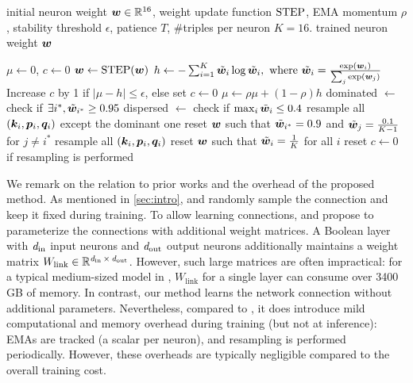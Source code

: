 \begin{algorithm}[tb]
  \caption{Adaptive Resampling}
  \label{alg:resampling}
  \begin{algorithmic}
     initial neuron weight ${\bm{w}} \in {\mathbb{R}}^{16}$, weight update function $\operatorname{STEP}$, EMA momentum $\rho$, stability threshold $\epsilon$, patience $T$, \#triples per neuron $K=16$.
     trained neuron weight ${\bm{w}}$

    \STATE $\mu \gets 0$, $c \gets 0$
    \REPEAT
      \STATE ${\bm{w}} \leftarrow \operatorname{STEP}({\bm{w}})$
      \STATE $h \gets - \sum_{i=1}^{K} \tilde{{\bm{w}}}_i \log \tilde{{\bm{w}}}_i, \text{ where } \tilde{{\bm{w}}}_i = \frac{\exp({\bm{w}}_i)}{\sum_j \exp({\bm{w}}_j)}$
      \STATE Increase $c$ by 1 if $|\mu - h| \le \epsilon$, else set $c \gets 0$
      \STATE $\mu \gets \rho \mu + (1-\rho) h$
        \STATE dominated $\gets$ check if $\exists i^*, \tilde{{\bm{w}}}_{i^*} \ge 0.95$
        \STATE dispersed $\gets$ check if $\max_i \tilde{{\bm{w}}}_i \le 0.4$
          \STATE resample all $({\bm{k}}_i, {\bm{p}}_i, {\bm{q}}_i)$ except the dominant one
          \STATE reset ${\bm{w}}$ such that $\tilde{{\bm{w}}}_{i^*}=0.9$ and $\tilde{{\bm{w}}}_j=\frac{0.1}{K-1}$ for $j \neq i^*$
          \STATE resample all $({\bm{k}}_i, {\bm{p}}_i, {\bm{q}}_i)$
          \STATE reset ${\bm{w}}$ such that $\tilde{{\bm{w}}}_i=\frac{1}{K}$ for all $i$
        \ENDIF
      \ENDIF
      \STATE reset $c \gets 0$ if resampling is performed
  \end{algorithmic}
\end{algorithm}

We remark on the relation to prior works and the overhead of the proposed method.
As mentioned in \cref{sec:intro}, 
\citet{petersen2022deep,petersen2024convolutional} and \citet{ruttgers2025light}
randomly sample the connection and keep it fixed during training. 
 To allow learning connections,  \citet{bacellar2024differentiable} and \citet{fojcik2025lilogic} 
propose to parameterize the connections with additional weight matrices.
A Boolean layer with $\operatorname*{{\mathit{d}_{\text{in}}}}$ input neurons and $\operatorname*{{\mathit{d}_{\text{out}}}}$ 
output neurons additionally maintains a weight matrix $W_{\text{link}} \in {\mathbb{R}}^{\operatorname*{{\mathit{d}_{\text{in}}}} \times \operatorname*{{\mathit{d}_{\text{out}}}}}$.
However, such large matrices are 
 often impractical: for a typical medium-sized model in  \citet{petersen2024convolutional}, $W_{\text{link}}$ for a single 
 layer can consume over 3400 GB of memory. In contrast, our method learns the network connection without 
 additional 
 parameters.
 Nevertheless, compared to \citet{petersen2022deep,petersen2024convolutional}, it does introduce mild computational and memory overhead during training (but not at inference): EMAs are tracked (a scalar per neuron), 
 and resampling is performed periodically. However, these overheads are typically negligible compared to the overall training cost. 

